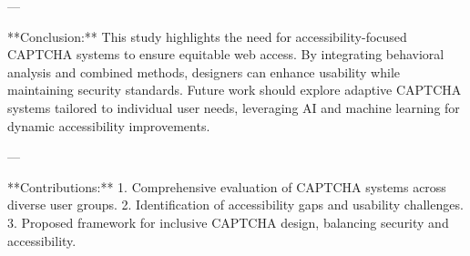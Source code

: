 ---

**Conclusion:**  
This study highlights the need for accessibility-focused CAPTCHA systems to ensure equitable web access. By integrating behavioral analysis and combined methods, designers can enhance usability while maintaining security standards. Future work should explore adaptive CAPTCHA systems tailored to individual user needs, leveraging AI and machine learning for dynamic accessibility improvements.  

---

**Contributions:**  
1. Comprehensive evaluation of CAPTCHA systems across diverse user groups.  
2. Identification of accessibility gaps and usability challenges.  
3. Proposed framework for inclusive CAPTCHA design, balancing security and accessibility.  


